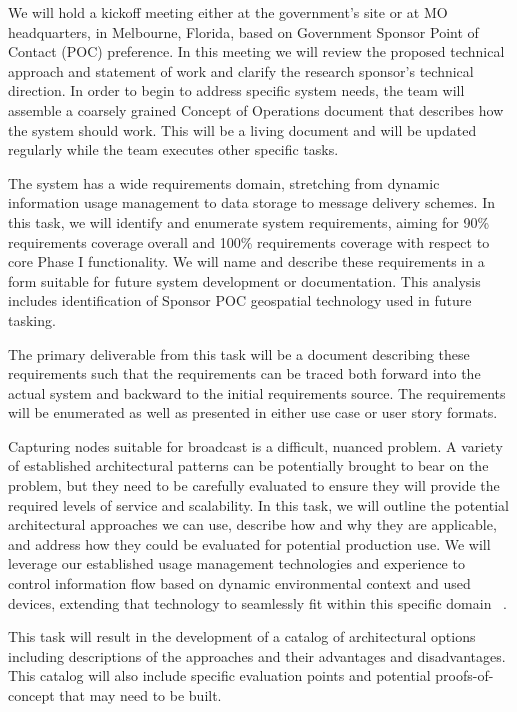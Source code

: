 \documentclass{sbir}
\begin{document}
We will hold a kickoff meeting either at the government's site or at MO headquarters, in Melbourne, Florida, based on Government Sponsor Point of Contact (POC) preference. In this meeting we will review the proposed technical approach and statement of work and clarify the research sponsor's technical direction. In order to begin to address specific system needs, the team will assemble a coarsely grained Concept of Operations document that describes how the system should work. This will be a living document and will be updated regularly while the team executes other specific tasks. 

The system has a wide requirements domain, stretching from dynamic information usage management to data storage to message delivery schemes. In this task, we will identify and enumerate system requirements, aiming for 90\% requirements coverage overall and 100\% requirements coverage with respect to core Phase I functionality. We will name and describe these requirements in a form suitable for future system development or documentation. This analysis includes identification of Sponsor POC geospatial technology used in future tasking.

The primary deliverable from this task will be a document describing these requirements such that the requirements can be traced both forward into the actual system and backward to the initial requirements source. The requirements will be enumerated as well as presented in either use case or user story formats.

Capturing nodes suitable for broadcast is a difficult, nuanced problem. A variety of established architectural patterns can be potentially brought to bear on the problem, but they need to be carefully evaluated to ensure they will provide the required levels of service and scalability. In this task, we will outline the potential architectural approaches we can use, describe how and why they are applicable, and address how they could be evaluated for potential production use. We will leverage our established usage management technologies and experience to control information flow based on dynamic environmental context and used devices, extending that technology to seamlessly fit within this specific domain ~\cite{JaLaHe:11,JaLaHe:12}.

This task will result in the development of a catalog of architectural options including descriptions of the approaches and their advantages and disadvantages. This catalog will also include specific evaluation points and potential proofs-of-concept that may need to be built.
\end{document}
